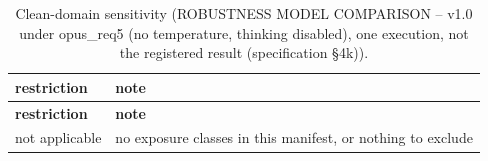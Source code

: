 \begingroup\footnotesize
\begin{longtable}{>{\raggedright\arraybackslash}p{126.4pt}>{\raggedright\arraybackslash}p{304.6pt}}
\caption{Clean-domain sensitivity (ROBUSTNESS MODEL COMPARISON -- v1.0 under opus\_\allowbreak{}req5 (no temperature, thinking disabled), one execution, not the registered result (specification §4k)).} \\
\toprule
\textbf{restriction} & \textbf{note} \\
\midrule
\endfirsthead
\toprule
\textbf{restriction} & \textbf{note} \\
\midrule
\endhead
\bottomrule
\endfoot
not applicable & no exposure classes in this manifest, or nothing to exclude \\
\end{longtable}
\endgroup
